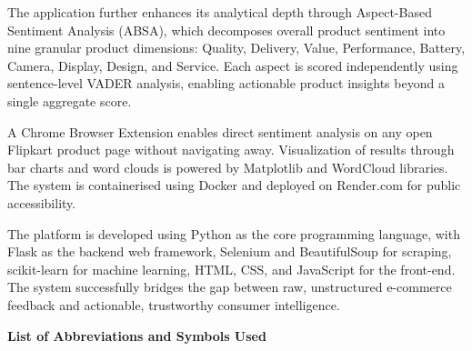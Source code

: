 \documentclass[12pt,a4paper]{report}
\begin{document}
\medskip
\noindent\hspace{1cm} The application further enhances its analytical depth through Aspect-Based Sentiment Analysis (ABSA), which decomposes overall product sentiment into nine granular product dimensions: Quality, Delivery, Value, Performance, Battery, Camera, Display, Design, and Service. Each aspect is scored independently using sentence-level VADER analysis, enabling actionable product insights beyond a single aggregate score.

\medskip
\noindent\hspace{1cm} A Chrome Browser Extension enables direct sentiment analysis on any open Flipkart product page without navigating away. Visualization of results through bar charts and word clouds is powered by Matplotlib and WordCloud libraries. The system is containerised using Docker and deployed on Render.com for public accessibility.

\medskip
\noindent\hspace{1cm} The platform is developed using Python as the core programming language, with Flask as the backend web framework, Selenium and BeautifulSoup for scraping, scikit-learn for machine learning, HTML, CSS, and JavaScript for the front-end. The system successfully bridges the gap between raw, unstructured e-commerce feedback and actionable, trustworthy consumer intelligence.

\newpage
\setcounter{page}{7}
\thispagestyle{fancy}
\renewcommand{\contentsname}{\centering Contents}
\tableofcontents

\newpage
\setcounter{page}{9}
\thispagestyle{fancy}
\renewcommand{\listfigurename}{\centering List of Figures}
\listoffigures

\newpage
\setcounter{page}{10}
\thispagestyle{fancy}

\begin{center}
{\large\textbf{List of Abbreviations and Symbols Used}}
\end{center}
\end{document}
